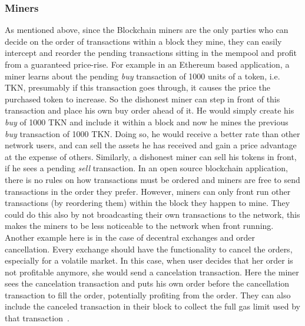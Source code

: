 \subsubsection{Miners}
As mentioned above, since the Blockchain miners are the only parties who can decide on the order of transactions within a block they mine, they can easily intercept and reorder the pending transactions sitting in the mempool and profit from a guaranteed price-rise. For example in an Ethereum based application, a miner learns about the pending \textit{buy} transaction of 1000 units of a token, i.e. TKN, presumably if this transaction goes through, it causes the price the purchased token to increase. So the dishonest miner can step in front of this transaction and  place his own buy order ahead of it. He would simply create his \textit{buy} of 1000 TKN and include it within a block and now he mines the previous \textit{buy} transaction of 1000 TKN. Doing so, he would receive a better rate than other network users, and can sell the assets he has received and gain a price advantage at the expense of others. Similarly, a dishonest miner can sell his tokens in front, if he sees a pending \textit{sell} transaction. In an open source blockchain application, there is no rules on how transactions must be ordered and miners are free to send transactions in the order they prefer. However, miners can only front run other transactions (by reordering them) within the block they happen to mine. They could do this also by not broadcasting their own transactions to the network, this makes the miners to be less noticeable to the network when front running.
Another example here is in the case of decentral exchanges and order cancellation. Every exchange should have the functionality to cancel the orders, especially for a volatile market. In this case, when user decides that her order is not profitable anymore, she would send a cancelation transaction. Here the miner sees the cancelation transaction and puts his own order before the cancellation transaction to fill the order, potentially profiting from the order. They can also include the canceled transaction in their block to collect the full gas limit used by that transaction~\cite{CostofDecentralization:online}.


